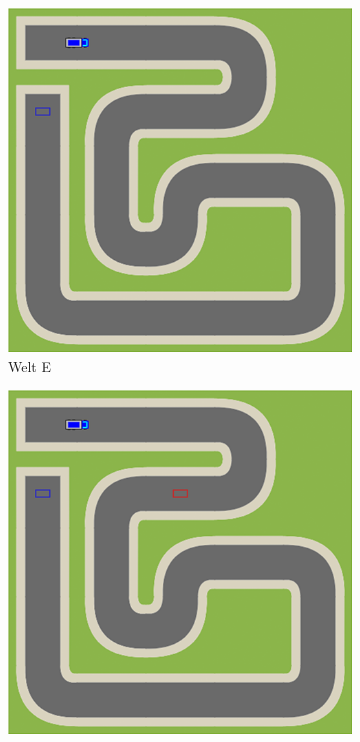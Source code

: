 \begin{figure}[H]
  \begin{subfigure}[b]{0.40\textwidth}
    \includegraphics[width=\textwidth]{gfx/exercises-world-e.png}
    \caption{Welt E}
  \end{subfigure}\hfill
  \vspace{0.5cm}
  \begin{subfigure}[b]{0.40\textwidth}
    \includegraphics[width=\textwidth]{gfx/exercises-world-f.png}

\end{subfigure}
\end{figure}
